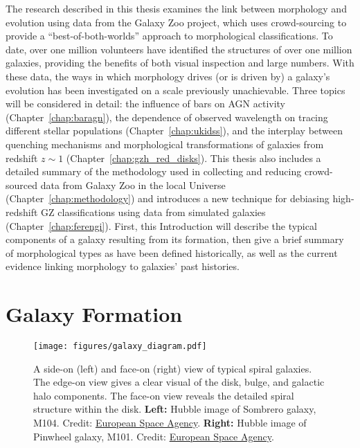 The research described in this thesis examines the link between morphology and evolution using data from the Galaxy Zoo project, which uses crowd-sourcing to provide a ``best-of-both-worlds'' approach to morphological classifications. To date, over one million volunteers have identified the structures of over one million galaxies, providing the benefits of both visual inspection and large numbers. With these data, the ways in which morphology drives (or is driven by) a galaxy's evolution has been investigated on a scale previously unachievable. Three topics will be considered in detail: the influence of bars on AGN activity (Chapter~\ref{chap:baragn}), the dependence of observed wavelength on tracing different stellar populations (Chapter~\ref{chap:ukidss}), and the interplay between quenching mechanisms and morphological transformations of galaxies from redshift $z\sim1$ (Chapter~\ref{chap:gzh_red_disks}). This thesis also includes a detailed summary of the methodology used in collecting and reducing crowd-sourced data from Galaxy Zoo in the local Universe (Chapter~\ref{chap:methodology}) and introduces a new technique for debiasing high-redshift GZ classifications using data from simulated galaxies (Chapter~\ref{chap:ferengi}). First, this Introduction will describe the typical components of a galaxy resulting from its formation, then give a brief summary of morphological types as have been defined historically, as well as the current evidence linking morphology to galaxies' past histories. 
 

\section{Galaxy Formation}

\begin{figure}
\centering
\texttt{[image: figures/galaxy\_diagram.pdf]}
\label{fig:galaxyfig}
\caption{A side-on (left) and face-on (right) view of typical spiral galaxies. The edge-on view gives a clear visual of the disk, bulge, and galactic halo components. The face-on view reveals the detailed spiral structure within the disk. \textbf{Left:} Hubble image of Sombrero galaxy, M104. Credit: \href{http://www.esa.int/spaceinimages/Images/2008/06/A_galaxy_and_its_halo}{European Space Agency}. \textbf{Right:} Hubble image of Pinwheel galaxy, M101. Credit: \href{http://sci.esa.int/hubble/38853-pinwheel-galaxy/}{European Space Agency}.  }
\end{figure}

